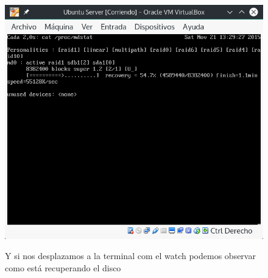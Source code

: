 \begin{figure}[H] %
	\centering
	\includegraphics[scale=0.5]{figuras/figura31.png}  %
	\label{figura31}
	
	\caption{Y si nos desplazamos a la terminal com el watch podemos observar como está recuperando el disco} 
\end{figure}
\newpage

